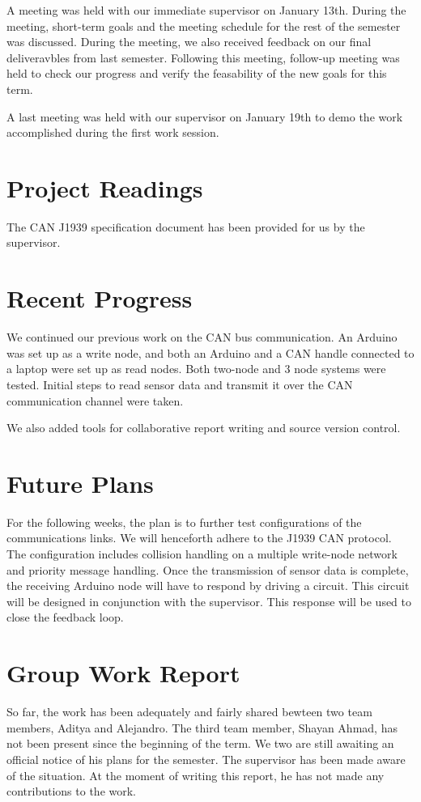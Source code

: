\documentclass[12pt]{article}
\begin{document}
A meeting was held with our immediate supervisor on January 13th. During the
meeting, short-term goals and the meeting schedule for the rest of the semester
was discussed. During the meeting, we also received feedback on our final 
deliveravbles from last semester. Following this meeting, follow-up meeting was
held to check our progress and verify the feasability of the new goals for 
this term.\newline

A last meeting was held with our supervisor on January 19th to demo the work
accomplished during the first work session. 

\section*{Project Readings}
The CAN J1939 specification document has been provided for us by the supervisor.

\section*{Recent Progress}
We continued our previous work on the CAN bus communication. An Arduino was set
up as a write node, and both an Arduino and a CAN handle connected to a laptop 
were set up as read nodes. Both two-node and 3 node systems were tested. 
Initial steps to read sensor data and transmit it over the CAN communication
channel were taken.\newline

We also added tools for collaborative report writing and source version control.

\section*{Future Plans}
For the following weeks, the plan is to further test configurations of the
communications links. We will henceforth adhere to the J1939 CAN protocol.
The configuration includes collision handling on a multiple write-node
network and priority message handling. Once the transmission of sensor data is
complete, the receiving Arduino node will have to respond by driving a circuit.
This circuit will be designed in conjunction with the supervisor. This response
will be used to close the feedback loop.

\section*{Group Work Report}
So far, the work has been adequately and fairly shared bewteen two team members,
Aditya and Alejandro. The third team member, Shayan Ahmad, has not been present
since the beginning of the term. We two are still awaiting an official notice
of his plans for the semester. The supervisor has been made aware of the
situation. At the moment of writing this report, he has not made any
contributions to the work.
\end{document}
